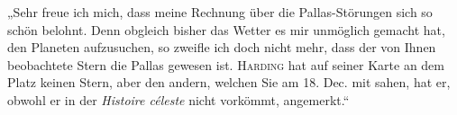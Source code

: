 \par\indent „Sehr freue ich mich, dass meine Rechnung über die Pallas-Störungen sich so schön belohnt. Denn obgleich bisher das Wetter es mir unmöglich gemacht hat, den Planeten aufzusuchen, so zweifle ich doch nicht mehr, dass der von Ihnen beobachtete Stern die Pallas gewesen ist. \textsc{Harding} hat auf seiner Karte an dem Platz keinen Stern, aber den andern, welchen Sie am 18. Dec. mit sahen, hat er, obwohl er in der \emph{Histoire céleste} nicht vorkömmt, angemerkt.“
